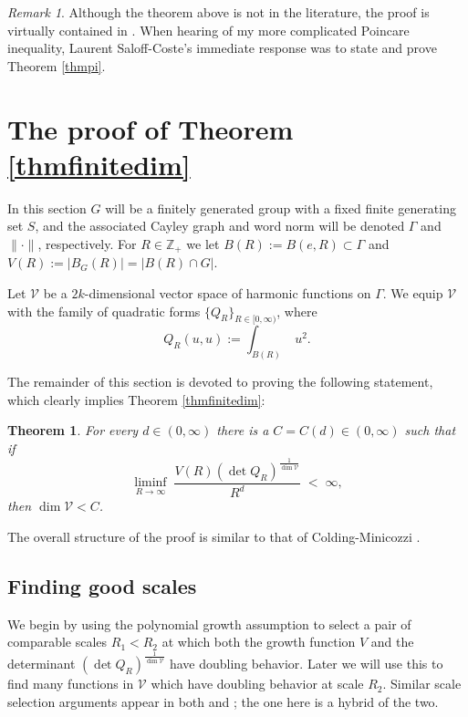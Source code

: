 \documentclass[12pt]{amsart}
\numberwithin{equation}{section}
\theoremstyle{plain}
\newtheorem{theorem}[equation]{Theorem}
\theoremstyle{remark}
\newtheorem{remark}[equation]{Remark}
\theoremstyle{definition}
\newcommand{\ra}{\rightarrow}
\newcommand{\V}{{\mathcal V}}
\newcommand{\Z}{\mathbb Z}
\def\Ga{\Gamma}
\def\ra{\rightarrow}
\def\defeq{:=}
\begin{document}
\begin{remark}
Although the theorem above is not in the literature,
the proof is virtually contained in 
\cite[pp.308-310]{coulhonsaloffcoste}.  When hearing
of my more complicated Poincare inequality, 
Laurent Saloff-Coste's immediate response was to state
and prove Theorem \ref{thmpi}.
\end{remark}




\section{The proof of Theorem \ref{thmfinitedim}}
\label{secproofmaintheorem}

In this section $G$ will be a finitely generated group with a fixed 
 finite
generating set $S$, and the associated Cayley graph and word 
norm 
will be
denoted $\Ga$ and $\|\cdot\|$, respectively.  For $R\in \Z_+$ we 
let $B(R)\defeq B(e,R)\subset\Ga$
and $V(R)\defeq |B_G(R)|=|B(R)\cap G|$.

Let $\V$ be a $2k$-dimensional vector space of harmonic functions 
on $\Ga$.
We equip $\V$ with the family  of quadratic forms 
$\{Q_R\}_{R\in [0,\infty)}$,
where 
$$
Q_R(u,u)\defeq \int_{B(R)}\;u^2.
$$

The remainder of this section is devoted to  proving
 the following statement, which clearly implies 
Theorem \ref{thmfinitedim}:
\begin{theorem}
\label{thmfinitedim'}
For every  $d\in (0,\infty)$ there is a $C=C(d)\in (0,\infty)$ such 
that if
\begin{equation}
\label{eqnliminfbounded}
\liminf_{R\ra \infty}\;
\frac{V(R)\left(\det Q_R\right)^{\frac{1}{\dim\V}}} {R^d}\;<\;\infty,
\end{equation}
then $\dim\V<C$.
\end{theorem}


The overall structure of the proof is similar to that of 
Colding-Minicozzi \cite{coldingminicozzi}.  


\subsection{Finding good scales}
We begin by using the polynomial growth assumption to select 
a pair of comparable scales $R_1<R_2$ at which both 
the growth function $V$ and the determinant 
$\left(\det Q_R\right)^{\frac{1}{\dim\V}}$ have doubling 
behavior.  Later we will use this to find many 
functions in $\V$ which have doubling behavior at scale $R_2$.  
Similar scale selection arguments appear in both 
\cite{polygrowth} and \cite{coldingminicozzi}; the one 
here is a hybrid of the two.
\end{document}
